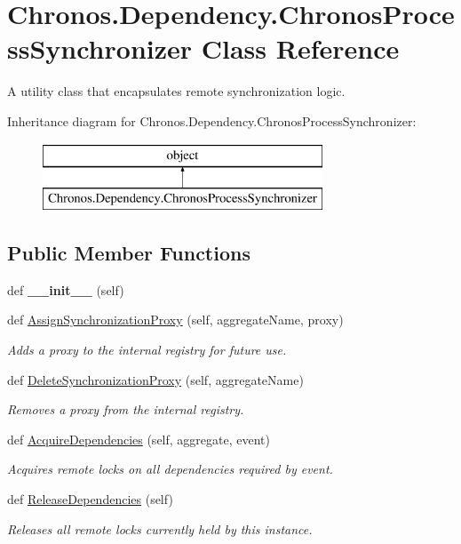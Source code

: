 \hypertarget{classChronos_1_1Dependency_1_1ChronosProcessSynchronizer}{}\section{Chronos.\+Dependency.\+Chronos\+Process\+Synchronizer Class Reference}
\label{classChronos_1_1Dependency_1_1ChronosProcessSynchronizer}


A utility class that encapsulates remote synchronization logic.  


Inheritance diagram for Chronos.\+Dependency.\+Chronos\+Process\+Synchronizer\+:\begin{figure}[H]
\begin{center}
\leavevmode
\includegraphics[height=2.000000cm]{classChronos_1_1Dependency_1_1ChronosProcessSynchronizer}
\end{center}
\end{figure}
\subsection*{Public Member Functions}
\begin{DoxyCompactItemize}
\item 
def {\bfseries \+\_\+\+\_\+init\+\_\+\+\_\+} (self)
\item 
def \hyperlink{group__Chronos_gaa5b77aa034528a45a2ea7ae04b430a2e}{Assign\+Synchronization\+Proxy} (self, aggregate\+Name, proxy)
\begin{DoxyCompactList}\small\item\em Adds a proxy to the internal registry for future use. \end{DoxyCompactList}\item 
def \hyperlink{group__Chronos_gaaf20aa3e37294492cf6f320d49ff64f2}{Delete\+Synchronization\+Proxy} (self, aggregate\+Name)
\begin{DoxyCompactList}\small\item\em Removes a proxy from the internal registry. \end{DoxyCompactList}\item 
def \hyperlink{group__Chronos_gad0ed4fb65d7d916312cd89e03a3c997a}{Acquire\+Dependencies} (self, aggregate, event)
\begin{DoxyCompactList}\small\item\em Acquires remote locks on all dependencies required by {\ttfamily event}. \end{DoxyCompactList}\item 
def \hyperlink{group__Chronos_ga461ce8c35896b5ebe0e18f3a76226c98}{Release\+Dependencies} (self)
\begin{DoxyCompactList}\small\item\em Releases all remote locks currently held by this instance. \end{DoxyCompactList}\end{DoxyCompactItemize}
